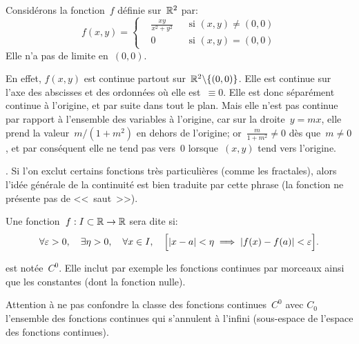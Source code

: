 \medskip
Considérons la fonction~$f$ définie sur~$\mathbb R^2$ par:
\begin{equation}
  f(x,y)=\left\{\begin{aligned}&\frac{xy}{x^2+y^2}&&\text{si~$(x,y)\neq(0,0)$} \\
&0&&\text{si~$(x,y)=(0,0)$} \end{aligned}\right.
\end{equation}
Elle n'a pas de limite en~$(0,0)$.

\small
En effet, $f(x,y)$ est continue partout sur~$\mathbb R^2\backslash\{(0,0)\}$.
Elle est continue sur l'axe des abscisses et des ordonnées où elle est~$\equiv0$.
Elle est donc séparément continue à l'origine, et par suite dans tout le plan.
Mais elle n'est pas continue par rapport à l'ensemble des variables à l'origine,
car sur la droite~$y=mx$, elle prend la valeur~$m/(1+m^2)$ en dehors de
l'origine; or~$\frac{m}{1+m^2}\ne0$ dès que~$m\ne0$, et par conséquent elle
ne tend pas vers~$0$ lorsque~$(x,y)$ tend vers l'origine.
\normalsize

\medskip
{}.
Si l'on exclut certains fonctions très particulières (comme les fractales), alors l'idée générale
de la continuité est bien traduite par cette phrase (la fonction ne présente pas de <<~saut~>>).

\medskip
\begin{definition}
Une fonction~$f: I\subset\mathbb R \to \mathbb R$ sera dite  si:
\begin{equation}
  \forall \varepsilon > 0, \quad \exists \eta > 0, \quad \forall x \in I, \quad \Bigl[|x - a| <\eta \implies |f(x) - f(a)|<\varepsilon\Bigr].
\end{equation}
\end{definition}

\medskip
{} est notée~$C^0$.
Elle inclut par exemple les fonctions continues par morceaux ainsi que les constantes (dont
la fonction nulle).

\medskip
Attention à ne pas confondre la classe des fonctions continues~$C^0$ avec
$C_0$ l'ensemble des fonctions continues qui s'annulent à l'infini (sous-espace de l'espace
des fonctions continues).

